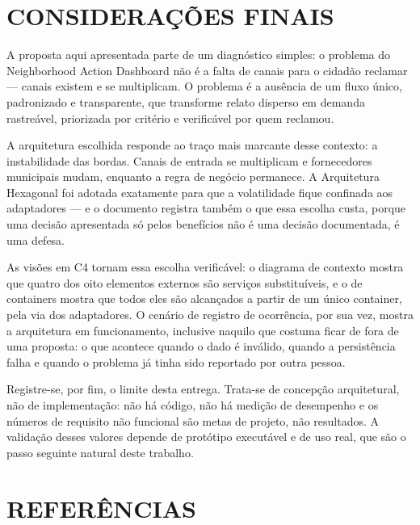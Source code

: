 \documentclass[12pt,a4paper,oneside]{article}
\begin{document}
\section{CONSIDERAÇÕES FINAIS}

A proposta aqui apresentada parte de um diagnóstico simples: o problema do
Neighborhood Action Dashboard não é a falta de canais para o cidadão reclamar —
canais existem e se multiplicam. O problema é a ausência de um fluxo único,
padronizado e transparente, que transforme relato disperso em demanda
rastreável, priorizada por critério e verificável por quem reclamou.

A arquitetura escolhida responde ao traço mais marcante desse contexto: a
instabilidade das bordas. Canais de entrada se multiplicam e fornecedores
municipais mudam, enquanto a regra de negócio permanece. A Arquitetura
Hexagonal foi adotada exatamente para que a volatilidade fique confinada aos
adaptadores — e o documento registra também o que essa escolha custa, porque uma
decisão apresentada só pelos benefícios não é uma decisão documentada, é uma
defesa.

As visões em C4 tornam essa escolha verificável: o diagrama de contexto mostra
que quatro dos oito elementos externos são serviços substituíveis, e o de
containers mostra que todos eles são alcançados a partir de um único container,
pela via dos adaptadores. O cenário de registro de ocorrência, por sua vez,
mostra a arquitetura em funcionamento, inclusive naquilo que costuma ficar de
fora de uma proposta: o que acontece quando o dado é inválido, quando a
persistência falha e quando o problema já tinha sido reportado por outra pessoa.

Registre-se, por fim, o limite desta entrega. Trata-se de concepção
arquitetural, não de implementação: não há código, não há medição de desempenho
e os números de requisito não funcional são metas de projeto, não resultados.
A validação desses valores depende de protótipo executável e de uso real, que
são o passo seguinte natural deste trabalho.

\newpage
{}
{}
\section*{REFERÊNCIAS}
\vspace{0.6\baselineskip}
\end{document}
